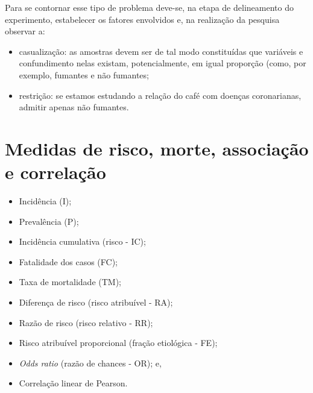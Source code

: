 \documentclass[
]{book}
\providecommand{\tightlist}{%
  \setlength{\itemsep}{0pt}\setlength{\parskip}{0pt}}
\begin{document}
\hfill\break

Para se contornar esse tipo de problema deve-se, na etapa de delineamento do experimento, estabelecer os fatores envolvidos e, na realização da pesquisa observar a:

\hfill\break

\begin{itemize}
\tightlist
\item
  casualização: as amostras devem ser de tal modo constituídas que variáveis e confundimento nelas existam, potencialmente, em igual proporção (como, por exemplo, fumantes e não fumantes;\\
\item
  restrição: se estamos estudando a relação do café com doenças coronarianas, admitir apenas não fumantes.
\end{itemize}

\hfill\break

\hypertarget{medidas-de-risco-morte-associauxe7uxe3o-e-correlauxe7uxe3o}{%
\section{Medidas de risco, morte, associação e correlação}\label{medidas-de-risco-morte-associauxe7uxe3o-e-correlauxe7uxe3o}}

\hfill\break

\begin{itemize}
\tightlist
\item
  Incidência (I);\\
\item
  Prevalência (P);\\
\item
  Incidência cumulativa (risco - IC);\\
\item
  Fatalidade dos casos (FC);\\
\item
  Taxa de mortalidade (TM);\\
\item
  Diferença de risco (risco atribuível - RA);\\
\item
  Razão de risco (risco relativo - RR);\\
\item
  Risco atribuível proporcional (fração etiológica - FE);\\
\item
  \emph{Odds ratio} (razão de chances - OR); e,\\
\item
  Correlação linear de Pearson.
\end{itemize}
\end{document}
